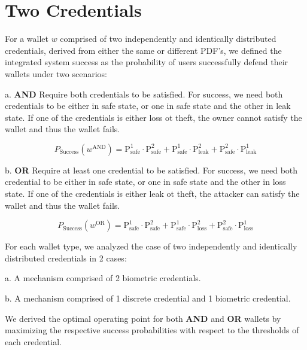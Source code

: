 \documentclass[sigconf]{acmart}
\theoremstyle{definition}
\begin{document}
\section{Two Credentials}\label{sec:5}
For a wallet $w$ comprised of two independently and identically distributed credentials, derived from either the same or different PDF’s, we defined the integrated system success as the probability of users successfully defend their wallets under two scenarios:

a. \textbf{AND} Require both credentials to be satisfied. For success, we need both credentials to be either in safe state, or one in safe state and the other in leak state. If one of the credentials is either loss ot theft, the owner cannot satisfy the wallet and thus the wallet fails.

\begin{equation}
    \label{eqn:andsuccess}
P_{\text{Success}}(w^{\text{AND}}) = \mathrm{P^1_{safe}} \cdot \mathrm{P^2_{safe}} + \mathrm{P^1_{safe}} \cdot \mathrm{P^2_{leak}} + \mathrm{P^2_{safe}} \cdot \mathrm{P^1_{leak}}
\end{equation}

b. \textbf{OR} Require at least one credential to be satisfied. For success, we need both credential to be either in safe state, or one in safe state and the other in loss state. If one of the credentials is either leak ot theft, the attacker can satisfy the wallet and thus the wallet fails.

\begin{equation}
    \label{eqn:orsuccess}
P_{\text{Success}}(w^{\text{OR}}) = \mathrm{P^1_{safe}} \cdot \mathrm{P^2_{safe}} + \mathrm{P^1_{safe}} \cdot \mathrm{P^2_{loss}} + \mathrm{P^2_{safe}} \cdot \mathrm{P^1_{loss}}
\end{equation}

For each wallet type, we analyzed the case of two independently and identically distributed credentials in 2 cases:

a. A mechanism comprised of 2 biometric credentials.

b. A mechanism comprised of 1 discrete credential and 1 biometric credential.

We derived the optimal operating point for both \textbf{AND} and \textbf{OR} wallets by maximizing the respective success probabilities with respect to the thresholds of each credential.
\end{document}
